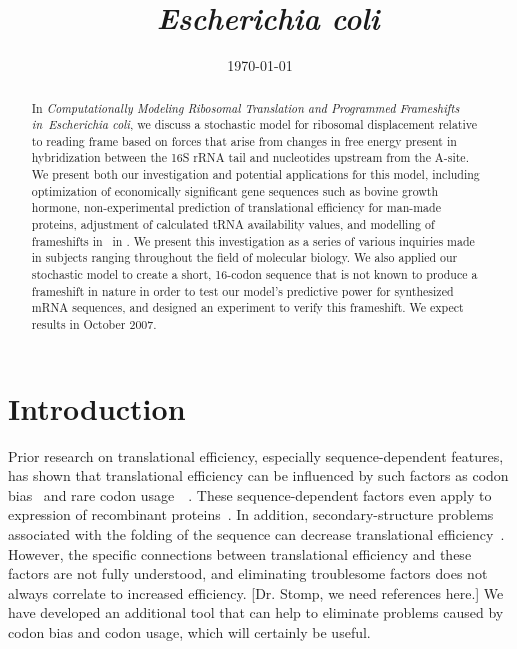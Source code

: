\documentclass[12pt, draft]{article}
\author{\sc{\BWFauthors}}
\date{{\sc \today}}
\title{\bf{\BWFtitle\ \emph{Escherichia coli}}}
\newcommand{\BWFtitle}{Computationally
  Modeling Ribosomal Translation and Programmed Frameshifts in}
\numberwithin{equation}{section}
\begin{document}
\begin{singlespace}
  \maketitle
  \tableofcontents
\end{singlespace}

\clearpage
\begin{abstract}\begin{normalsize}
  In \emph{\BWFtitle\ Escherichia coli}, we discuss a stochastic model for ribosomal displacement relative to reading 
  frame based on forces that arise from changes in free energy present in hybridization between the 
  16S rRNA tail and nucleotides upstream from the A-site.  We present both our investigation and 
  potential applications for this model, including optimization of economically significant gene
  sequences such as bovine growth hormone, non-experimental prediction of translational efficiency for man-made 
  proteins, adjustment of calculated tRNA availability values, and modelling of frameshifts in \prfB\ in \ecoli.
  We present this investigation as a series of various inquiries made 
  in subjects ranging throughout the field of molecular biology.  We also applied our stochastic 
  model to create a short, 16-codon sequence that is not known to produce a frameshift in nature 
  in order to test our model's predictive power for synthesized mRNA sequences, and designed an 
  experiment to verify this frameshift.  We expect results in October 2007.
\end{normalsize}\end{abstract}
\clearpage
{}

\section{Introduction}
Prior research on translational efficiency, especially sequence-dependent features, has shown that 
translational efficiency can be influenced by such factors as codon bias~\cite{gustafsson04} and 
rare codon usage~\cite{kane95}~\cite{ikemura}.  These sequence-dependent factors even apply to 
expression of recombinant proteins~\cite{sorensen05}.  In addition, secondary-structure problems 
associated with the folding of the sequence can decrease translational efficiency~\cite{kozak05}. 
However, the specific connections between translational efficiency and these factors are not fully 
understood, and eliminating troublesome factors does not always correlate to increased efficiency. 
[Dr. Stomp, we need references here.]  We have developed an additional tool that can help to 
eliminate problems caused by codon bias and codon usage, which will certainly be useful.  
\end{document}
